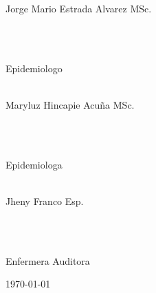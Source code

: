 \begin{titlepage}
\begin{minipage}{0.5\textwidth}
\begin{flushleft}
			Jorge Mario Estrada Alvarez MSc. %
		\end{flushleft}
	\end{minipage}
	~
	\begin{minipage}{0.4\textwidth}
		\begin{flushright}
			\large
			\textit{}\\
			Epidemiologo %
		\end{flushright}
	\end{minipage}

	\begin{minipage}{0.5\textwidth}
		\begin{flushleft}
			\large
			\textit{}\\
			Maryluz Hincapie Acuña MSc. %
		\end{flushleft}
	\end{minipage}
	~
	\begin{minipage}{0.4\textwidth}
		\begin{flushright}
			\large
			\textit{}\\
			Epidemiologa %
		\end{flushright}
	\end{minipage}

	\begin{minipage}{0.5\textwidth}
		\begin{flushleft}
			\large
			\textit{}\\
			Jheny Franco Esp. %
		\end{flushleft}
	\end{minipage}
	~
	\begin{minipage}{0.4\textwidth}
		\begin{flushright}
			\large
			\textit{}\\
			Enfermera Auditora %
		\end{flushright}
	\end{minipage}
	
	
	
	\vfill\vfill\vfill %
	
	{\large\today} %
	
	
	
	
\end{titlepage}



